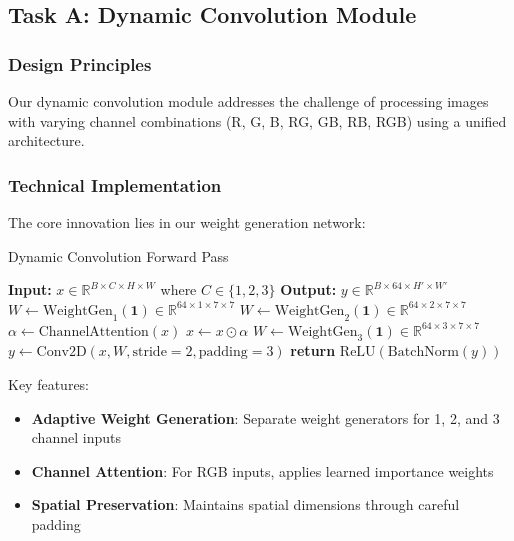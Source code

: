 \documentclass[11pt,a4paper]{article}
\begin{document}
\subsection{Task A: Dynamic Convolution Module}

\subsubsection{Design Principles}
Our dynamic convolution module addresses the challenge of processing images with varying channel combinations (R, G, B, RG, GB, RB, RGB) using a unified architecture.

\subsubsection{Technical Implementation}
The core innovation lies in our weight generation network:

\begin{algorithm}
\caption{Dynamic Convolution Forward Pass}
\begin{algorithmic}
\STATE \textbf{Input:} $x \in \mathbb{R}^{B \times C \times H \times W}$ where $C \in \{1, 2, 3\}$
\STATE \textbf{Output:} $y \in \mathbb{R}^{B \times 64 \times H' \times W'}$
\STATE
{}
    \STATE $W \leftarrow \text{WeightGen}_1(\mathbf{1}) \in \mathbb{R}^{64 \times 1 \times 7 \times 7}$
    \STATE $W \leftarrow \text{WeightGen}_2(\mathbf{1}) \in \mathbb{R}^{64 \times 2 \times 7 \times 7}$
\ELSE
    \STATE $\alpha \leftarrow \text{ChannelAttention}(x)$
    \STATE $x \leftarrow x \odot \alpha$
    \STATE $W \leftarrow \text{WeightGen}_3(\mathbf{1}) \in \mathbb{R}^{64 \times 3 \times 7 \times 7}$
\ENDIF
\STATE $y \leftarrow \text{Conv2D}(x, W, \text{stride}=2, \text{padding}=3)$
\STATE \textbf{return} $\text{ReLU}(\text{BatchNorm}(y))$
\end{algorithmic}
\end{algorithm}

Key features:
\begin{itemize}
    \item \textbf{Adaptive Weight Generation}: Separate weight generators for 1, 2, and 3 channel inputs
    \item \textbf{Channel Attention}: For RGB inputs, applies learned importance weights
    \item \textbf{Spatial Preservation}: Maintains spatial dimensions through careful padding
\end{itemize}
\end{document}
